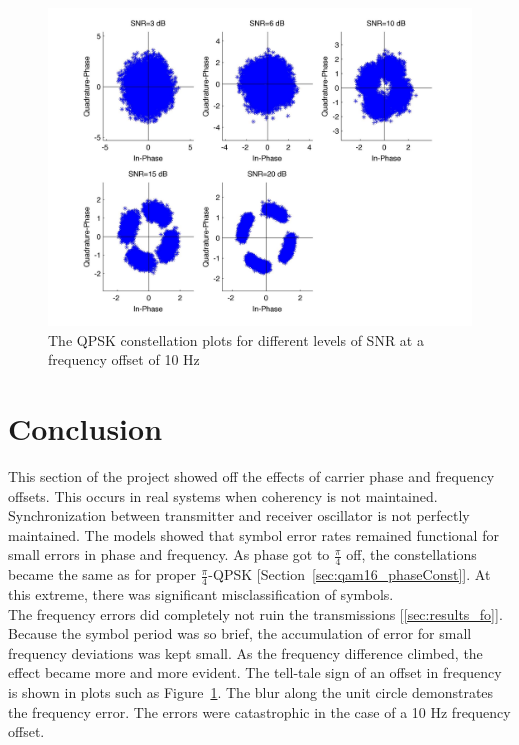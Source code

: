 \documentclass[]{article}
\begin{document}
\begin{figure}[H]
\centering
\hspace*{-2cm}\includegraphics[width=1.3\textwidth]{qpConstfo4.jpg}
\caption{The QPSK constellation plots for different levels of SNR at a frequency offset of 10 Hz \label{fig:qpsk_freq}}
\end{figure}


\newpage
\section{Conclusion}
\label{sec:conc}
This section of the project showed off the effects of carrier phase and frequency offsets.  This occurs in real systems when coherency is not maintained.  Synchronization between transmitter and receiver oscillator is not perfectly maintained.  The models showed that symbol error rates remained functional for small errors in phase and frequency.  As phase got to $\frac{\pi}{4}$ off, the constellations became the same as for proper $\frac{\pi}{4}$-QPSK [Section~\ref{sec:qam16_phaseConst}].  At this extreme, there was significant misclassification of symbols.  \\

The frequency errors did completely not ruin the transmissions [\ref{sec:results_fo}].  Because the symbol period was so brief, the accumulation of error for small frequency deviations was kept small.  As the frequency difference climbed, the effect became more and more evident.  The tell-tale sign of an offset in frequency is shown in plots such as Figure~\ref{fig:qpsk_freq}.  The blur along the unit circle demonstrates the frequency error.  The errors were catastrophic in the case of a 10 Hz frequency offset.  \\
\end{document}
